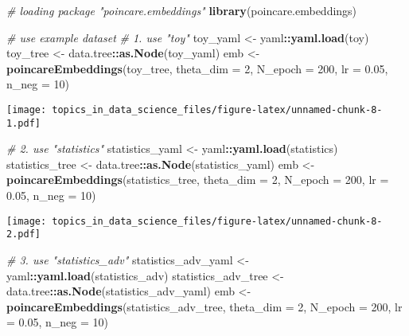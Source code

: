 \documentclass[
  11pt,
]{book}
\newenvironment{Shaded}{\begin{snugshade}}{\end{snugshade}}
\newcommand{\CommentTok}[1]{\textcolor[rgb]{0.56,0.35,0.01}{\textit{#1}}}
\newcommand{\DataTypeTok}[1]{\textcolor[rgb]{0.13,0.29,0.53}{#1}}
\newcommand{\DecValTok}[1]{\textcolor[rgb]{0.00,0.00,0.81}{#1}}
\newcommand{\FloatTok}[1]{\textcolor[rgb]{0.00,0.00,0.81}{#1}}
\newcommand{\KeywordTok}[1]{\textcolor[rgb]{0.13,0.29,0.53}{\textbf{#1}}}
\newcommand{\NormalTok}[1]{#1}
\newcommand{\OperatorTok}[1]{\textcolor[rgb]{0.81,0.36,0.00}{\textbf{#1}}}
\newcommand{\StringTok}[1]{\textcolor[rgb]{0.31,0.60,0.02}{#1}}
\begin{document}
\begin{Shaded}
\begin{Highlighting}[]
\CommentTok{# loading package "poincare.embeddings"}
\KeywordTok{library}\NormalTok{(poincare.embeddings)}

\CommentTok{# use example dataset}
\CommentTok{# 1. use "toy"}
\NormalTok{toy_yaml <-}\StringTok{ }\NormalTok{yaml}\OperatorTok{::}\KeywordTok{yaml.load}\NormalTok{(toy)}
\NormalTok{toy_tree <-}\StringTok{ }\NormalTok{data.tree}\OperatorTok{::}\KeywordTok{as.Node}\NormalTok{(toy_yaml)}
\NormalTok{emb <-}\StringTok{ }\KeywordTok{poincareEmbeddings}\NormalTok{(toy_tree, }\DataTypeTok{theta_dim =} \DecValTok{2}\NormalTok{, }\DataTypeTok{N_epoch =} \DecValTok{200}\NormalTok{, }\DataTypeTok{lr =} \FloatTok{0.05}\NormalTok{, }\DataTypeTok{n_neg =} \DecValTok{10}\NormalTok{)}
\end{Highlighting}
\end{Shaded}

\texttt{[image: topics\_in\_data\_science\_files/figure-latex/unnamed-chunk-8-1.pdf]}

\begin{Shaded}
\begin{Highlighting}[]
\CommentTok{# 2. use "statistics"}
\NormalTok{statistics_yaml <-}\StringTok{ }\NormalTok{yaml}\OperatorTok{::}\KeywordTok{yaml.load}\NormalTok{(statistics)}
\NormalTok{statistics_tree <-}\StringTok{ }\NormalTok{data.tree}\OperatorTok{::}\KeywordTok{as.Node}\NormalTok{(statistics_yaml)}
\NormalTok{emb <-}\StringTok{ }\KeywordTok{poincareEmbeddings}\NormalTok{(statistics_tree, }\DataTypeTok{theta_dim =} \DecValTok{2}\NormalTok{, }\DataTypeTok{N_epoch =} \DecValTok{200}\NormalTok{, }\DataTypeTok{lr =} \FloatTok{0.05}\NormalTok{, }\DataTypeTok{n_neg =} \DecValTok{10}\NormalTok{)}
\end{Highlighting}
\end{Shaded}

\texttt{[image: topics\_in\_data\_science\_files/figure-latex/unnamed-chunk-8-2.pdf]}

\begin{Shaded}
\begin{Highlighting}[]
\CommentTok{# 3. use "statistics_adv"}
\NormalTok{statistics_adv_yaml <-}\StringTok{ }\NormalTok{yaml}\OperatorTok{::}\KeywordTok{yaml.load}\NormalTok{(statistics_adv)}
\NormalTok{statistics_adv_tree <-}\StringTok{ }\NormalTok{data.tree}\OperatorTok{::}\KeywordTok{as.Node}\NormalTok{(statistics_adv_yaml)}
\NormalTok{emb <-}\StringTok{ }\KeywordTok{poincareEmbeddings}\NormalTok{(statistics_adv_tree, }\DataTypeTok{theta_dim =} \DecValTok{2}\NormalTok{, }\DataTypeTok{N_epoch =} \DecValTok{200}\NormalTok{, }\DataTypeTok{lr =} \FloatTok{0.05}\NormalTok{, }\DataTypeTok{n_neg =} \DecValTok{10}\NormalTok{)}
\end{Highlighting}
\end{Shaded}
\end{document}
